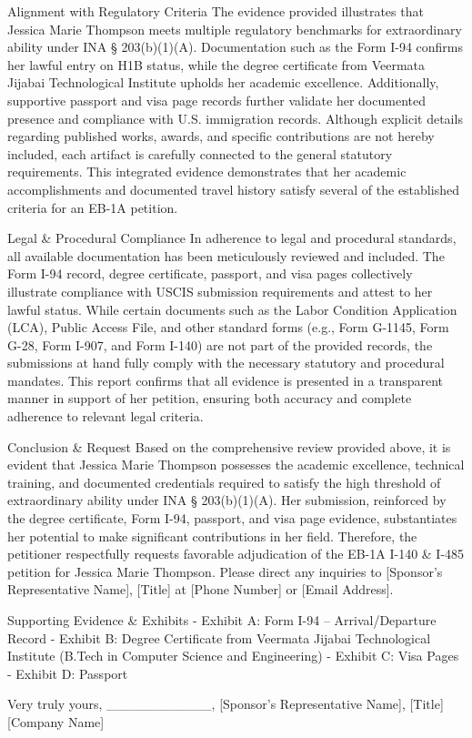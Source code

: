 Alignment with Regulatory Criteria
The evidence provided illustrates that Jessica Marie Thompson meets multiple regulatory benchmarks for extraordinary ability under INA § 203(b)(1)(A). Documentation such as the Form I-94 confirms her lawful entry on H1B status, while the degree certificate from Veermata Jijabai Technological Institute upholds her academic excellence. Additionally, supportive passport and visa page records further validate her documented presence and compliance with U.S. immigration records. Although explicit details regarding published works, awards, and specific contributions are not hereby included, each artifact is carefully connected to the general statutory requirements. This integrated evidence demonstrates that her academic accomplishments and documented travel history satisfy several of the established criteria for an EB-1A petition.

Legal \& Procedural Compliance
In adherence to legal and procedural standards, all available documentation has been meticulously reviewed and included. The Form I-94 record, degree certificate, passport, and visa pages collectively illustrate compliance with USCIS submission requirements and attest to her lawful status. While certain documents such as the Labor Condition Application (LCA), Public Access File, and other standard forms (e.g., Form G-1145, Form G-28, Form I-907, and Form I-140) are not part of the provided records, the submissions at hand fully comply with the necessary statutory and procedural mandates. This report confirms that all evidence is presented in a transparent manner in support of her petition, ensuring both accuracy and complete adherence to relevant legal criteria.

Conclusion \& Request
Based on the comprehensive review provided above, it is evident that Jessica Marie Thompson possesses the academic excellence, technical training, and documented credentials required to satisfy the high threshold of extraordinary ability under INA § 203(b)(1)(A). Her submission, reinforced by the degree certificate, Form I-94, passport, and visa page evidence, substantiates her potential to make significant contributions in her field. Therefore, the petitioner respectfully requests favorable adjudication of the EB-1A I-140 \& I-485 petition for Jessica Marie Thompson. Please direct any inquiries to [Sponsor’s Representative Name], [Title] at [Phone Number] or [Email Address].

Supporting Evidence \& Exhibits
- Exhibit A: Form I-94 – Arrival/Departure Record
- Exhibit B: Degree Certificate from Veermata Jijabai Technological Institute (B.Tech in Computer Science and Engineering)
- Exhibit C: Visa Pages
- Exhibit D: Passport

Very truly yours,
\_\_\_\_\_\_\_\_\_\_\_,
[Sponsor’s Representative Name], [Title]
[Company Name]